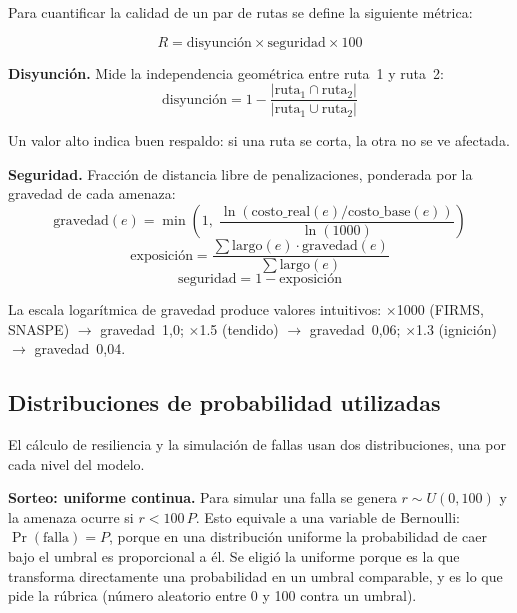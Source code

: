 \documentclass[conference]{IEEEtran}
\begin{document}
Para cuantificar la calidad de un par de rutas se define la siguiente métrica:

\begin{equation}
R = \text{disyunción} \times \text{seguridad} \times 100
\label{eq:resiliencia}
\end{equation}

\textbf{Disyunción.} Mide la independencia geométrica entre ruta~1 y ruta~2:
\begin{equation}
\text{disyunción} = 1 - \frac{|\text{ruta}_1 \cap \text{ruta}_2|}{|\text{ruta}_1 \cup \text{ruta}_2|}
\end{equation}

Un valor alto indica buen respaldo: si una ruta se corta, la otra no se ve afectada.

\textbf{Seguridad.} Fracción de distancia libre de penalizaciones, ponderada por la gravedad de cada amenaza:
\begin{equation}
\text{gravedad}(e) = \min\!\left(1,\; \frac{\ln(\text{costo\_real}(e) / \text{costo\_base}(e))}{\ln(1000)}\right)
\end{equation}
\begin{equation}
\text{exposición} = \frac{\sum \text{largo}(e) \cdot \text{gravedad}(e)}{\sum \text{largo}(e)}
\end{equation}
\begin{equation}
\text{seguridad} = 1 - \text{exposición}
\end{equation}

La escala logarítmica de gravedad produce valores intuitivos: $\times$1000 (FIRMS, SNASPE) $\to$ gravedad~1,0; $\times$1.5 (tendido) $\to$ gravedad~0,06; $\times$1.3 (ignición) $\to$ gravedad~0,04.

\subsection{Distribuciones de probabilidad utilizadas}
\label{sec:distribuciones}

El cálculo de resiliencia y la simulación de fallas usan dos distribuciones, una por cada nivel del modelo.

\textbf{Sorteo: uniforme continua.} Para simular una falla se genera $r \sim U(0,100)$ y la amenaza ocurre si $r < 100\,P$. Esto equivale a una variable de Bernoulli: $\Pr(\text{falla}) = P$, porque en una distribución uniforme la probabilidad de caer bajo el umbral es proporcional a él. Se eligió la uniforme porque es la que transforma directamente una probabilidad en un umbral comparable, y es lo que pide la rúbrica (número aleatorio entre 0 y 100 contra un umbral).
\end{document}

